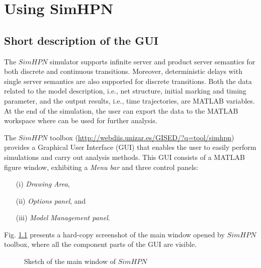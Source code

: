 

\chapter{Using SimHPN}

\section{Short description of the GUI}
The $SimHPN$ simulator supports {\color{red} infinite server} and {\color{red}product server semantics} for both discrete and continuous transitions. Moreover, deterministic delays with single server semantics are also supported for discrete transitions. Both the data related to the model description, i.e., net structure, initial marking and timing parameter, and the output results, i.e., time trajectories, are MATLAB variables. At the end of the simulation, the user can export the data to the MATLAB workspace where can be used for further analysis. 

The $SimHPN$ toolbox (\url{http://webdiis.unizar.es/GISED/?q=tool/simhpn}) provides a Graphical User Interface (GUI) that enables the user to easily perform simulations and carry out analysis methods.  This GUI consists of a MATLAB figure window, exhibiting a \emph{Menu bar} and three control panels: 
\begin{itemize}
\item[(i)] \emph{Drawing Area}, 
\item[(ii)] \emph{Options panel}, and 
\item[(iii)] \emph{Model Management panel}. 
\end{itemize}
Fig. \ref{GUI} presents a hard-copy screenshot of the main window opened by $SimHPN$ toolbox, where all the component parts of the GUI are visible.

\begin{figure}[!htb]
   \caption[htb!]{Sketch of the main window of $SimHPN$}\label{GUI}
\end{figure}

